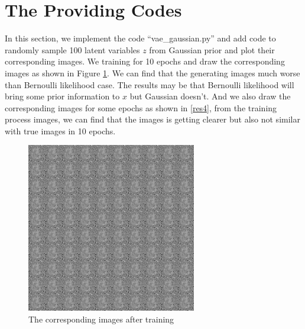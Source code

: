 \documentclass{elegantbook}
\begin{document}
\section{The Providing Codes}
In this section, we implement the code ``vae\_gaussian.py'' and add code to randomly sample 100 latent variables $z$ from Gaussian prior and plot their corresponding images. We training for 10 epochs and draw the corresponding images as shown in Figure \ref{res3}. We can find that the generating images much worse than Bernoulli likelihood case. The results may be that Bernoulli likelihood will bring some prior information to $x$ but Gaussian doesn't. And we also draw the corresponding images for some epochs as shown in \ref{res4}, from the training process images, we can find that the images is getting clearer but also not similar with true images in 10 epochs.
\begin{figure}[!h]
	\centering
	\includegraphics[width=0.8\linewidth]{../results/vae_gaussian_epoch_10.png}
	\caption{\label{res3}The corresponding images after training}
\end{figure}
\end{document}
